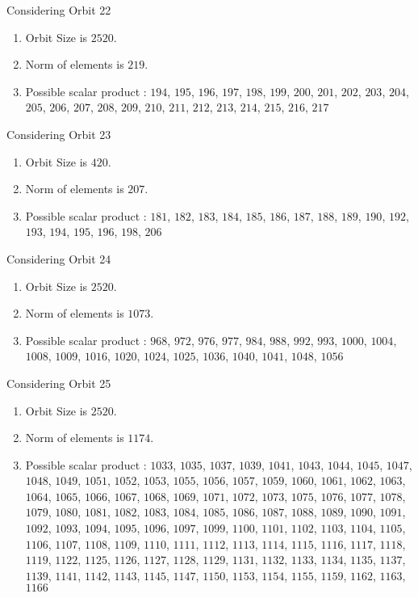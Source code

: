 \documentclass[12pt]{article}
\begin{document}
Considering Orbit 22
\begin{enumerate}
\item Orbit Size is $2520$.
\item Norm of elements is $219$.
\item Possible scalar product : $194$, $195$, $196$, $197$, $198$, $199$, $200$, $201$, $202$, $203$, $204$, $205$, $206$, $207$, $208$, $209$, $210$, $211$, $212$, $213$, $214$, $215$, $216$, $217$
\end{enumerate}
Considering Orbit 23
\begin{enumerate}
\item Orbit Size is $420$.
\item Norm of elements is $207$.
\item Possible scalar product : $181$, $182$, $183$, $184$, $185$, $186$, $187$, $188$, $189$, $190$, $192$, $193$, $194$, $195$, $196$, $198$, $206$
\end{enumerate}
Considering Orbit 24
\begin{enumerate}
\item Orbit Size is $2520$.
\item Norm of elements is $1073$.
\item Possible scalar product : $968$, $972$, $976$, $977$, $984$, $988$, $992$, $993$, $1000$, $1004$, $1008$, $1009$, $1016$, $1020$, $1024$, $1025$, $1036$, $1040$, $1041$, $1048$, $1056$
\end{enumerate}
Considering Orbit 25
\begin{enumerate}
\item Orbit Size is $2520$.
\item Norm of elements is $1174$.
\item Possible scalar product : $1033$, $1035$, $1037$, $1039$, $1041$, $1043$, $1044$, $1045$, $1047$, $1048$, $1049$, $1051$, $1052$, $1053$, $1055$, $1056$, $1057$, $1059$, $1060$, $1061$, $1062$, $1063$, $1064$, $1065$, $1066$, $1067$, $1068$, $1069$, $1071$, $1072$, $1073$, $1075$, $1076$, $1077$, $1078$, $1079$, $1080$, $1081$, $1082$, $1083$, $1084$, $1085$, $1086$, $1087$, $1088$, $1089$, $1090$, $1091$, $1092$, $1093$, $1094$, $1095$, $1096$, $1097$, $1099$, $1100$, $1101$, $1102$, $1103$, $1104$, $1105$, $1106$, $1107$, $1108$, $1109$, $1110$, $1111$, $1112$, $1113$, $1114$, $1115$, $1116$, $1117$, $1118$, $1119$, $1122$, $1125$, $1126$, $1127$, $1128$, $1129$, $1131$, $1132$, $1133$, $1134$, $1135$, $1137$, $1139$, $1141$, $1142$, $1143$, $1145$, $1147$, $1150$, $1153$, $1154$, $1155$, $1159$, $1162$, $1163$, $1166$
\end{enumerate}
\end{document}
